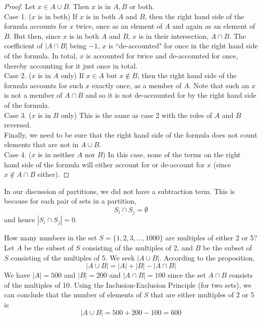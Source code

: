 \documentclass[handout]{ximera}
\begin{document}
\begin{proof}
Let $x \in A \cup B$.  Then $x$ is in $A, B$ or both.\\
Case 1. ($x$ is in both)
If $x$ is in both $A$ and $B$, then the right hand side of the formula accounts for $x$ twice, 
once as an element of $A$ and again as an element of $B$. But then, since $x$ is in 
both $A$ and $B$, $x$ is in their intersection, $A \cap B$.  
The coefficient of $|A \cap B|$ being $-1$, $x$ is ``de-accounted" for once in the 
right hand side of the formula.  In total, $x$ is accounted for twice and de-accounted for once, 
thereby accounting for it just once in total.\\
Case 2. ($x$ is in $A$ only)
If $x \in A$ but $x \notin B$, then the right hand side of the formula accounts 
for such $x$ exactly once, as a member of $A$.  Note that such an $x$ is not a 
member of $A \cap B$ and so it is not de-accounted for by the right hand side of the formula.\\
Case 3. ($x$ is in $B$ only)
This is the same as case 2 with the roles of $A$ and $B$ reversed.\\
Finally, we need to be sure that the right hand side of the formula does not count elements that are not in $A \cup B$.\\
Case 4. ($x$ is in neither $A$ nor $B$)
In this case, none of the terms on the right hand side of the formula will either account 
for or de-account for $x$ (since $x \notin A \cap B$ either).
\end{proof}


\begin{remark}
In our discussion of partitions, we did not have a subtraction term.  This is because for each pair of sets in a partition,
\[
S_i \cap S_j = \emptyset
\]
and hence $|S_i \cap S_j| = 0$.
\end{remark}


\begin{example}[example 1]
How many numbers in the set $S = \{1,2,3, \ldots, 1000\}$ are multiples of either 2 or 5?\\
Let $A$ be the subset of $S$ consisting of the multiples of 2, and $B$ be the subset of $S$ consisting of the multiples of 5.
We seek $|A \cup B|$. According to the proposition, 
\[
|A \cup B| = |A| + |B| - |A \cap B|
\]
We have $|A| =500$ and $|B| = 200$ and $|A \cap B| = 100$ since the set $A \cap B$ consists of the multiples of 10.  
Using the Inclusion-Exclusion Principle (for two sets), we can conclude 
that the number of elements of $S$ that are either multiples of 2 or 5 is
\[
|A \cup B| = 500 + 200 - 100 = 600
\]
\end{example}
\end{document}
